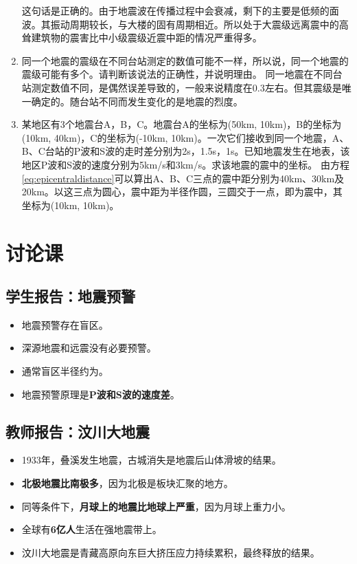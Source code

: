 \documentclass[twoside,titlepage,hyperref,UTF8,12pt]{ctexart}
\begin{document}
\begin{enumerate}
    {\kaishu{}这句话是正确的。由于地震波在传播过程中会衰减，剩下的主要是低频的面波。其振动周期较长，与大楼的固有周期相近。所以处于大震级远离震中的高耸建筑物的震害比中小级震级近震中距的情况严重得多。}
    \item 同一个地震的震级在不同台站测定的数值可能不一样，所以说，同一个地震的震级可能有多个。请判断该说法的正确性，并说明理由。\newline
    {\kaishu{}同一地震在不同台站测定数值不同，是偶然误差导致的，一般来说精度在0.3左右。但其震级是唯一确定的。随台站不同而发生变化的是地震的烈度。}
    \item 某地区有3个地震台A，B，C。地震台A的坐标为(50km, 10km)，B的坐标为(10km, 40km)，C的坐标为(-10km, 10km)。一次它们接收到同一个地震，A、B、C台站的P波和S波的走时差分别为2s，1.5s，1s。已知地震发生在地表，该地区P波和S波的速度分别为5km/s和3km/s。求该地震的震中的坐标。\newline
    {\kaishu{}由方程\ref{eq:epicentraldistance}可以算出A、B、C三点的震中距分别为40km、30km及20km。以这三点为圆心，震中距为半径作圆，三圆交于一点，即为震中，其坐标为(10km, 10km)。}
\end{enumerate}

\newpage
\section{讨论课}

\subsection{学生报告：地震预警}
\begin{itemize}
    \item 地震预警存在盲区。
    \item 深源地震和远震没有必要预警。
    \item 通常盲区半径约为。
    \item 地震预警原理是\textbf{P波和S波的速度差}。
\end{itemize}

\subsection{教师报告：汶川大地震}
\begin{itemize}
    \item 1933年，叠溪发生地震，古城消失是地震后山体滑坡的结果。
    \item \textbf{北极地震比南极多}，因为北极是板块汇聚的地方。
    \item 同等条件下，\textbf{月球上的地震比地球上严重}，因为月球上重力小。
    \item 全球有\textbf{6亿人}生活在强地震带上。
    \item 汶川大地震是青藏高原向东巨大挤压应力持续累积，最终释放的结果。
\end{itemize}
\end{document}
